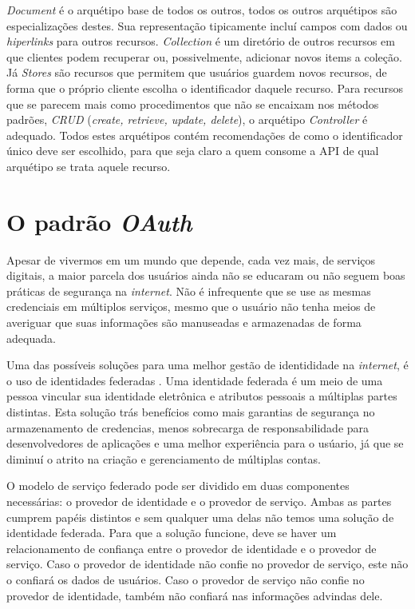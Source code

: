 \emph{Document} é o arquétipo base de todos os outros, todos os outros arquétipos são especializações 
destes. Sua representação tipicamente incluí campos com dados ou \emph{hiperlinks} para outros 
recursos. \emph{Collection} é um diretório de outros recursos em que clientes podem recuperar 
ou, possivelmente, adicionar novos items a coleção. Já \emph{Stores} são recursos que permitem 
que usuários guardem novos recursos, de forma que o próprio cliente escolha o 
identificador daquele recurso. Para recursos que se parecem mais como procedimentos que 
não se encaixam nos métodos padrões, \emph{CRUD} (\emph{create, retrieve, update, delete}),
  o arquétipo \emph{Controller} é adequado. Todos estes arquétipos 
  contém recomendações de como o identificador único deve ser escolhido, para que seja 
  claro a quem consome a API de qual arquétipo se trata aquele recurso.

  \section{O padrão \emph{OAuth}}
  Apesar de vivermos em um mundo que depende, cada vez mais, de serviços digitais,
  a maior parcela dos usuários ainda não se educaram ou 
  não seguem boas práticas de segurança na \emph{internet}. Não é infrequente que se 
  use as mesmas credenciais em múltiplos serviços, mesmo que o usuário 
  não tenha meios de averiguar que suas informações são manuseadas e armazenadas de forma 
  adequada.

  Uma das possíveis soluções para uma melhor gestão de identididade na \emph{internet}, 
  é o uso de identidades federadas \cite{208723}. Uma identidade federada é um meio 
  de uma pessoa vincular sua identidade eletrônica e atributos pessoais 
  a múltiplas partes distintas. Esta solução trás benefícios como mais garantias
  de segurança no armazenamento de credencias, menos sobrecarga de responsabilidade 
  para desenvolvedores de aplicações e uma melhor experiência para o usúario, já que se 
  diminuí o atrito na criação e gerenciamento de múltiplas contas.

  O modelo de serviço federado pode ser dividido em duas componentes necessárias: 
  o provedor de identidade e o provedor de serviço. Ambas as partes cumprem papéis 
  distintos e sem qualquer uma delas não temos uma solução de identidade federada. 
  Para que a solução funcione, deve se haver um relacionamento de confiança entre 
  o provedor de identidade e o provedor de serviço. Caso o provedor de identidade 
  não confie no provedor de serviço, este não o confiará os dados de usuários.
  Caso o provedor de serviço não confie no provedor de identidade, 
  também não confiará nas informações advindas dele.

